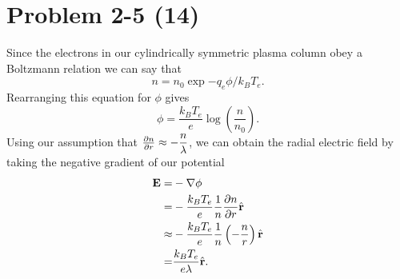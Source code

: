 \section*{Problem 2-5 (14)}
\label{sec:2-5}
Since the electrons in our cylindrically symmetric plasma column obey a Boltzmann relation we can say that
\begin{equation*}
	n = n_0\exp{-q_e\phi/k_BT_e}.
\end{equation*}
Rearranging this equation for \(\phi \) gives
\begin{equation*}
	\phi = \dfrac{k_BT_e}{e}\log(\dfrac{n}{n_0}).
\end{equation*}
Using our assumption that \(\frac{\partial n}{\partial r} \approx -\dfrac{n}{\lambda} \), we can obtain the radial electric field by taking the negative gradient of our potential
\begin{align*}
	\textbf{E} =& -\nabla \phi\\
	=& -\dfrac{k_BT_e}{e}\dfrac{1}{n}\frac{\partial n}{\partial r}\hat{\textbf{r}} \\
	\approx& -\dfrac{k_BT_e}{e}\dfrac{1}{n}\left(-\dfrac{n}{r}\right)\hat{\textbf{r}} \\
	=& \dfrac{k_BT_e}{e\lambda}\hat{\textbf{r}}.
\end{align*}

